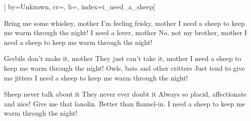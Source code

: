 

[%
    by={Unknown},
    cr={},
    li={},
    index={i_need_a_sheep}]


    \label{i_need_a_sheep}

    \beginverse\memorize[verse]
        Bring me some whiskey, mother
        I'm feeling frisky, mother
        I need a sheep to keep me warm through the night!
        I need a lover, mother
        No, not my brother, mother
        I need a sheep to keep me warm through the night!
    \endverse

    \beginverse\replay[verse]
        Gerbils don't make it, mother
        They just can't take it, mother
        I need a sheep to keep me warm through the night!
        Owls, bats and other critters
        Just tend to give me jitters
        I need a sheep to keep me warm through the night!
    \endverse

    \beginchorus
        Sheep never talk about it
        They never ever doubt it
        Always so placid, affectionate and nice!
        Give me that lanolin.
        Better than flannel-in.
        I need a sheep to keep me warm through the night!
    \endchorus
\endsong
